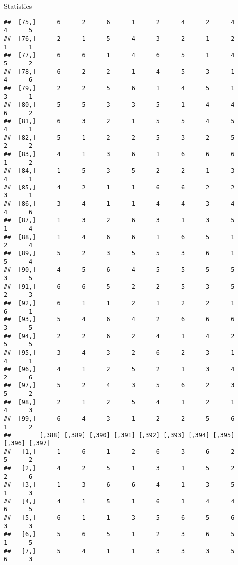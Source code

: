 \documentclass[
  ignorenonframetext,
]{beamer}
\begin{document}
\begin{frame}[fragile]{Statistics}
\begin{verbatim}
##  [75,]      6      2      6      1      2      4      2      4      4      5
##  [76,]      2      1      5      4      3      2      1      2      1      1
##  [77,]      6      6      1      4      6      5      1      4      5      2
##  [78,]      6      2      2      1      4      5      3      1      4      6
##  [79,]      2      2      5      6      1      4      5      1      3      1
##  [80,]      5      5      3      3      5      1      4      4      6      2
##  [81,]      6      3      2      1      5      5      4      5      4      1
##  [82,]      5      1      2      2      5      3      2      5      2      2
##  [83,]      4      1      3      6      1      6      6      6      1      2
##  [84,]      1      5      3      5      2      2      1      3      4      1
##  [85,]      4      2      1      1      6      6      2      2      3      1
##  [86,]      3      4      1      1      4      4      3      4      4      6
##  [87,]      1      3      2      6      3      1      3      5      1      4
##  [88,]      1      4      6      6      1      6      5      1      2      4
##  [89,]      5      2      3      5      5      3      6      1      5      4
##  [90,]      4      5      6      4      5      5      5      5      3      5
##  [91,]      6      6      5      2      2      5      3      5      2      3
##  [92,]      6      1      1      2      1      2      2      1      6      1
##  [93,]      5      4      6      4      2      6      6      6      3      5
##  [94,]      2      2      6      2      4      1      4      2      5      5
##  [95,]      3      4      3      2      6      2      3      1      4      1
##  [96,]      4      1      2      5      2      1      3      4      2      6
##  [97,]      5      2      4      3      5      6      2      3      5      2
##  [98,]      2      1      2      5      4      1      2      1      4      3
##  [99,]      6      4      3      1      2      2      5      6      1      2
##        [,388] [,389] [,390] [,391] [,392] [,393] [,394] [,395] [,396] [,397]
##   [1,]      1      6      1      2      6      3      6      2      5      2
##   [2,]      4      2      5      1      3      1      5      2      2      6
##   [3,]      1      3      6      6      4      1      3      5      1      3
##   [4,]      4      1      5      1      6      1      4      4      6      5
##   [5,]      6      1      1      3      5      6      5      6      3      3
##   [6,]      5      6      5      1      2      3      6      5      1      5
##   [7,]      5      4      1      1      3      3      3      5      6      3

\end{verbatim}
\end{frame}
\end{document}
